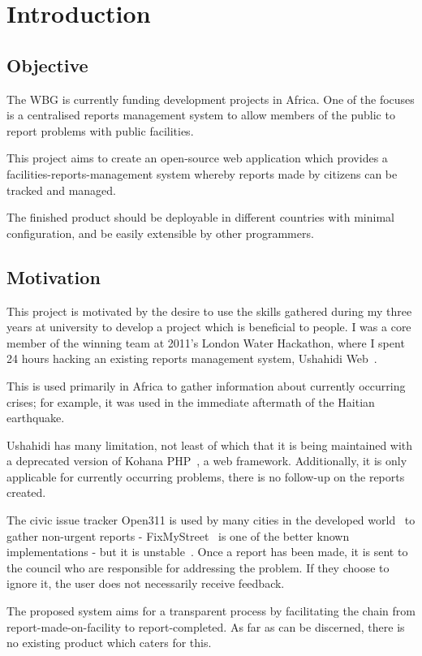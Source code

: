 \chapter{Introduction}
\section{Objective}
The \gls{WBG} is currently funding development projects in Africa. One of the focuses is a centralised reports management system to allow members of the public to report problems with public facilities.

This project aims to create an open-source web application which provides a facilities-reports-management system whereby reports made by citizens can be tracked and managed.

The finished product should be deployable in different countries with minimal configuration, and be easily extensible by other programmers.

\section{Motivation}
This project is motivated by the desire to use the skills gathered during my three years at university to develop a project which is beneficial to people. I was a core member of the winning team at 2011's London Water Hackathon, where I spent 24 hours hacking an existing reports management system, Ushahidi Web~\cite{ushahidiweb}.

This is used primarily in Africa to gather information about currently occurring crises; for example, it was used in the immediate aftermath of the Haitian earthquake.

Ushahidi has many limitation, not least of which that it is being maintained with a deprecated version of Kohana PHP~\cite{kohana}, a web framework. Additionally, it is only applicable for currently occurring problems, there is no follow-up on the reports created.

The civic issue tracker Open311 is used by many cities in the developed world~\cite{open311known} to gather non-urgent reports - FixMyStreet~\cite{fixmystreetuk} is one of the better known implementations - but it is unstable~\cite{open311api}. Once a report has been made, it is sent to the council who are responsible for addressing the problem. If they choose to ignore it, the user does not necessarily receive feedback.

The proposed system aims for a transparent process by facilitating the chain from report-made-on-facility to report-completed. As far as can be discerned, there is no existing product which caters for this.

